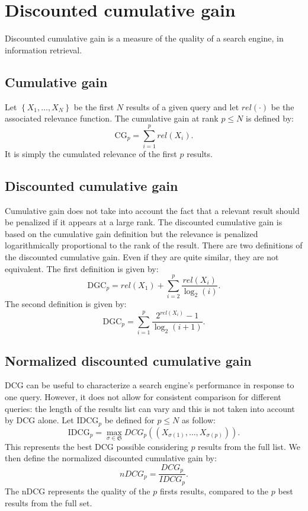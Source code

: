 \documentclass[a4paper]{article}
\begin{document}
\section{Discounted cumulative gain}

Discounted cumulative gain is a measure of the quality of a search engine, in information retrieval.

\subsection{Cumulative gain}
Let $\left\{ X_1, \ldots, X_N \right\}$ be the first $N$ results of a given query and let $rel(\cdot)$ 
be the associated relevance function. The cumulative gain at rank $p \le N$ is defined by:
\[
  \mathrm{CG}_p = \sum_{i = 1}^{p} rel(X_i).
\]
It is simply the cumulated relevance of the first $p$ results.

\subsection{Discounted cumulative gain}
Cumulative gain does not take into account the fact that a relevant result should be penalized if it 
appears at a large rank. The discounted cumulative gain is based on the cumulative gain definition 
but the relevance is penalized logarithmically proportional to the rank of the result. There are two 
definitions of the discounted cumulative gain. Even if they are quite similar, they are not equivalent. 
The first definition is given by:
\[
  \mathrm{DGC}_p = rel(X_1) + \sum_{i = 2}^{p} \frac{rel(X_i)}{\log_2(i)}.
\]
The second definition is given by:
\[
  \mathrm{DGC}_p = \sum_{i = 1}^{p} \frac{2^{rel(X_i)} - 1}{\log_2(i + 1)}.
\]

\subsection{Normalized discounted cumulative gain}
DCG can be useful to characterize a search engine's performance in response to one query. However, 
it does not allow for consistent comparison for different queries: the length of the results list 
can vary and this is not taken into account by DCG alone. Let $\mathrm{IDCG}_p$ be defined for 
$p \le N$ as follow:
\[
  \mathrm{IDCG}_p = \max_{\sigma \in \mathfrak{S}} DCG_p\left( \left( X_{\sigma(1)}, \ldots, X_{\sigma(p)} \right) \right).
\]
This represents the best DCG possible considering $p$ results from the full list. We then define 
the normalized discounted cumulative gain by:
\[
  nDCG_p = \frac{DCG_p}{IDCG_p}.
\]
The nDCG represents the quality of the $p$ firsts results, compared to the $p$ best results from the
full set.
\end{document}
